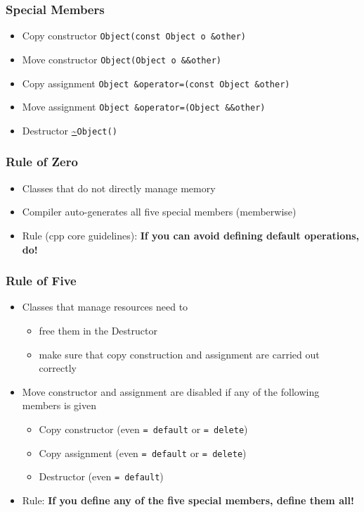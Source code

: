 \documentclass[usenames,dvipsnames,svgnames,table,aspectratio=169]{beamer}
\begin{document}
\begin{frame}
    \frametitle{Special Members}
    \begin{itemize}
        \item<+-> Copy constructor \lstinline{Object(const Object o &other)}
        \item<+-> Move constructor \lstinline{Object(Object o &&other)}
        \item<+-> Copy assignment \lstinline{Object &operator=(const Object &other)}
        \item<+-> Move assignment \lstinline{Object &operator=(Object &&other)}
        \item<+-> Destructor \url{~}\lstinline{Object()}
    \end{itemize}
\end{frame}

\begin{frame}
    \frametitle{Rule of Zero}
    \begin{itemize}
        \item<+-> Classes that do not directly manage memory
        \item<+-> Compiler auto-generates all five special members (memberwise)
        \item<+-> Rule (cpp core guidelines): \textbf{If you can avoid defining default operations, do!}
    \end{itemize}
    \only<+->{}
\end{frame}

\begin{frame}
    \frametitle{Rule of Five}
    \begin{itemize}
        \item<+-> Classes that manage resources need to
        \begin{itemize}
            \item<+-> free them in the Destructor
            \item<+-> make sure that copy construction and assignment are carried out correctly
        \end{itemize}
        \item<+-> Move constructor and assignment are disabled if any of the following members is given
        \begin{itemize}
            \item<+-> Copy constructor (even \lstinline|= default| or \lstinline|= delete|)
            \item<+-> Copy assignment (even \lstinline|= default| or \lstinline|= delete|)
            \item<+-> Destructor (even \lstinline|= default|)
        \end{itemize}
        \item<+-> Rule: \textbf{If you define any of the five special members, define them all!}
    \end{itemize}
\end{frame}
\end{document}

